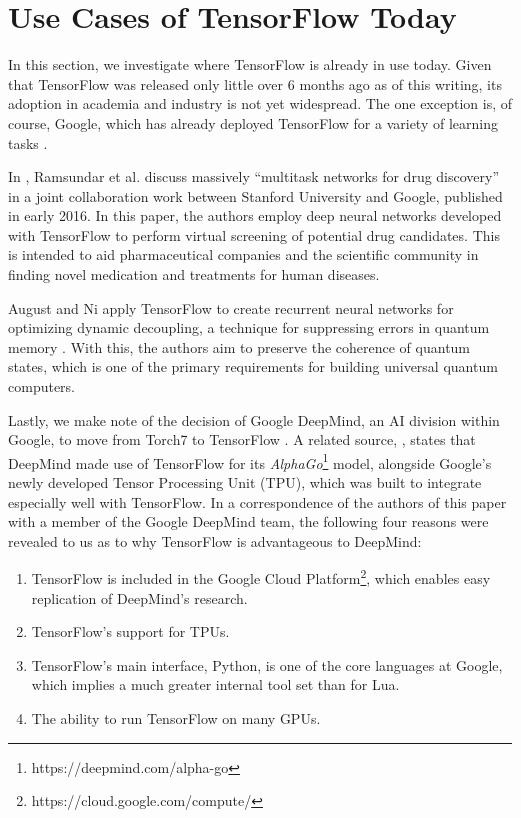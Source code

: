 \section{Use Cases of TensorFlow Today}\label{sec:uses}

In this section, we investigate where TensorFlow is already in use today. Given
that TensorFlow was released only little over 6 months ago as of this writing,
its adoption in academia and industry is not yet widespread. The one exception
is, of course, Google, which has already deployed TensorFlow for a variety of
learning tasks \cite{phones, emails, drugs, inception}.

In \cite{drugs}, Ramsundar et al. discuss massively ``multitask networks for
drug discovery'' in a joint collaboration work between Stanford University and
Google, published in early 2016. In this paper, the authors employ deep neural
networks developed with TensorFlow to perform virtual screening of potential
drug candidates. This is intended to aid pharmaceutical companies and the
scientific community in finding novel medication and treatments for human
diseases.

August and Ni apply TensorFlow to create recurrent neural networks for
optimizing dynamic decoupling, a technique for suppressing errors in quantum
memory \cite{august}. With this, the authors aim to preserve the coherence of
quantum states, which is one of the primary requirements for building universal
quantum computers.

Lastly, we make note of the decision of Google DeepMind, an AI division within
Google, to move from Torch7 to TensorFlow \cite{deepmind}. A related source,
\cite{tpu}, states that DeepMind made use of TensorFlow for its
\emph{AlphaGo}\footnote{https://deepmind.com/alpha-go} model, alongside Google's
newly developed Tensor Processing Unit (TPU), which was built to integrate
especially well with TensorFlow. In a correspondence of the authors of this
paper with a member of the Google DeepMind team, the following four reasons were
revealed to us as to why TensorFlow is advantageous to DeepMind:

\begin{enumerate}
\item TensorFlow is included in the Google Cloud
  Platform\footnote{https://cloud.google.com/compute/}, which enables easy
  replication of DeepMind's research.
\item TensorFlow's support for TPUs.
\item TensorFlow's main interface, Python, is one of the core languages at
  Google, which implies a much greater internal tool set than for Lua.
\item The ability to run TensorFlow on many GPUs.
\end{enumerate}

